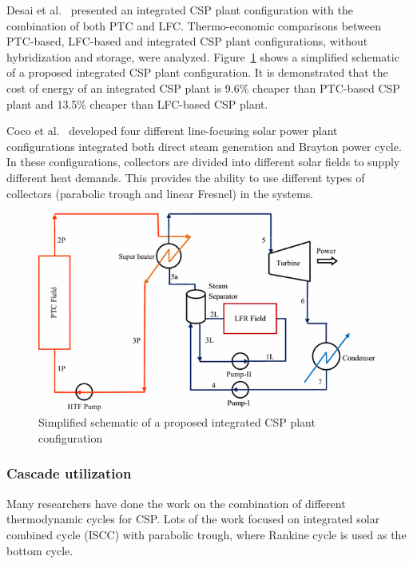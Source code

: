 Desai et al.~\cite{Desai2015} presented an integrated CSP plant configuration with the combination of both PTC and LFC. Thermo-economic comparisons between PTC-based, LFC-based and integrated CSP plant configurations, without hybridization and storage, were analyzed. Figure~\ref{fig:Desai2015} shows a simplified schematic of a proposed integrated CSP plant configuration. It is demonstrated that the cost of energy of an integrated CSP plant is 9.6\% cheaper than PTC-based CSP plant and 13.5\% cheaper than LFC-based CSP plant.

Coco et al.~\cite{Coco2015} developed four different line-focusing solar power plant configurations integrated both direct steam generation and Brayton power cycle. In these configurations, collectors are divided into different solar fields to supply different heat demands. This provides the ability to use different types of collectors (parabolic trough and linear Fresnel) in the systems.

\begin{figure}[!ht]
\centering
\includegraphics[width=.8\textwidth]{fig/Desai2015.jpg}
\caption{Simplified schematic of a proposed integrated CSP plant configuration}\label{fig:Desai2015}
\end{figure}

\subsubsection{Cascade utilization}

Many researchers have done the work on the combination of different thermodynamic cycles for CSP. Lots of the work focused on integrated solar combined cycle (ISCC) with parabolic trough, where Rankine cycle is used as the bottom cycle.

